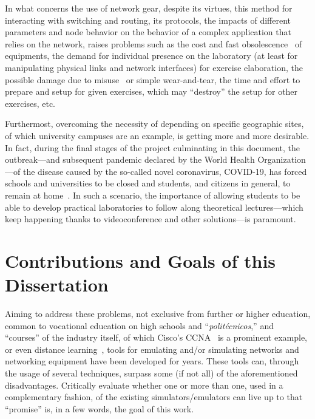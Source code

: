 In what concerns the use of network gear, despite its virtues, this method for interacting with switching and routing, its protocols, the impacts of different parameters and node behavior on the behavior of a complex application that relies on the network, raises problems such as the cost and fast obsolescence~\cite{automaticnetconfiggns} of equipments, the demand for individual presence on the laboratory (at least for manipulating physical links and network interfaces) for exercise elaboration, the possible damage due to misuse~\cite{teachinginovation} or simple wear-and-tear, the time and effort to prepare and setup for given exercises, which may ``destroy'' the setup for other exercises, etc. %

Furthermost, overcoming the necessity of depending on specific geographic sites, of which university campuses are an example, is getting more and more desirable.
In fact, during the final stages of the project culminating in this document, the outbreak---and subsequent pandemic declared by the World Health Organization---of the disease caused by the so-called novel coronavirus, COVID-19, has forced schools and universities to be closed and students, and citizens in general, to remain at home~\cite{covid19}.
In such a scenario, the importance of allowing students to be able to develop practical laboratories to follow along theoretical lectures---which keep happening thanks to videoconference and other solutions---is paramount.

\section{Contributions and Goals of this Dissertation}

Aiming to address these problems, not exclusive from further or higher education, common to vocational education on high schools and ``\emph{politécnicos},'' and ``courses'' of the industry itself, of which Cisco's CCNA~\cite{ccna} is a prominent example, or even distance learning~\cite{networkvirtwithgns}, tools for emulating and/or simulating networks and networking equipment have been developed for years. %
These tools can, through the usage of several techniques, surpass some (if not all) of the aforementioned disadvantages.
Critically evaluate whether one or more than one, used in a complementary fashion, of the existing simulators/emulators can live up to that ``promise'' is, in a few words, the goal of this work.

